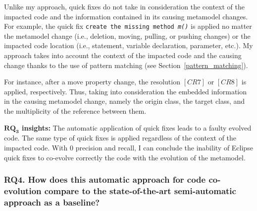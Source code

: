 
Unlike my approach, quick fixes do not take in consideration the context of the impacted code and the information contained in its causing metamodel changes. For example, the quick fix \texttt{create the missing method \emph{m()}} is applied no matter the metamodel change (i.e., deletion, moving, pulling, or pushing changes) or the impacted code location (i.e., statement, variable declaration, parameter, etc.). %
My approach takes into account the context of the impacted code and the causing change thanks to the use of pattern matching (see Section~\ref{pattern_matching}). 


For instance, after a move property change, the resolution $[CR7]$ or $[CR8]$ is applied, respectively. Thus, taking into consideration the embedded information in the causing metamodel change, namely the origin class, the target class, and the multiplicity of the reference between them.



\begin{tcolorbox}[boxsep=-2pt]
\textbf{$\boldsymbol{RQ_3}$ insights:}
The automatic application of quick fixes leads to a faulty evolved code. The same type of quick fixes is applied regardless of the context of the impacted code. With 0 precision and recall, I can conclude the inability of Eclipse quick fixes to co-evolve correctly the code with the evolution of the metamodel. 
\red{}

\end{tcolorbox}



\subsubsection{RQ4. How does this automatic approach for code co-evolution compare to the state-of-the-art semi-automatic approach as a baseline?}

